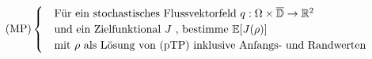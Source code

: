 \begin{align}
\text{(MP)}
\begin{cases}
\label{Modellproblem}
&\text{Für ein stochastisches Flussvektorfeld } q: \Omega \times \overline{\mathbb{D}} \to \mathbb{R}^2 \\
&\text{und ein Zielfunktional } J \text{ , bestimme }  \mathbb{E}[J(\rho)]  \\
&\text{mit } \rho \text{ als Lösung von (pTP) inklusive Anfangs- und Randwerten}
\end{cases}
\end{align} 
